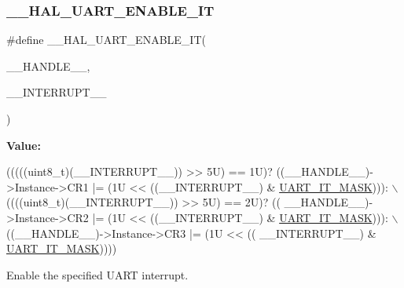 \subsubsection{\texorpdfstring{\+\_\+\+\_\+\+H\+A\+L\+\_\+\+U\+A\+R\+T\+\_\+\+E\+N\+A\+B\+L\+E\+\_\+\+IT}{\_\_HAL\_UART\_ENABLE\_IT}}
{\footnotesize\ttfamily \#define \+\_\+\+\_\+\+H\+A\+L\+\_\+\+U\+A\+R\+T\+\_\+\+E\+N\+A\+B\+L\+E\+\_\+\+IT(\begin{DoxyParamCaption}\item[{}]{\+\_\+\+\_\+\+H\+A\+N\+D\+L\+E\+\_\+\+\_\+,  }\item[{}]{\+\_\+\+\_\+\+I\+N\+T\+E\+R\+R\+U\+P\+T\+\_\+\+\_\+ }\end{DoxyParamCaption})}

{\bfseries Value\+:}
\begin{DoxyCode}
(((((uint8\_t)(\_\_INTERRUPT\_\_)) >> 5U) == 1U)? ((\_\_HANDLE\_\_)->Instance->CR1 |= (1U << ((\_\_INTERRUPT\_\_) & 
      \hyperlink{group___u_a_r_t___interruption___mask_ga869439269c26e8dee93d49b1c7e67448}{UART\_IT\_MASK}))): \(\backslash\)
                                                           ((((uint8\_t)(\_\_INTERRUPT\_\_)) >> 5U) == 2U)? ((
      \_\_HANDLE\_\_)->Instance->CR2 |= (1U << ((\_\_INTERRUPT\_\_) & \hyperlink{group___u_a_r_t___interruption___mask_ga869439269c26e8dee93d49b1c7e67448}{UART\_IT\_MASK}))): \(\backslash\)
                                                           ((\_\_HANDLE\_\_)->Instance->CR3 |= (1U << ((
      \_\_INTERRUPT\_\_) & \hyperlink{group___u_a_r_t___interruption___mask_ga869439269c26e8dee93d49b1c7e67448}{UART\_IT\_MASK}))))
\end{DoxyCode}


Enable the specified U\+A\+RT interrupt. 


